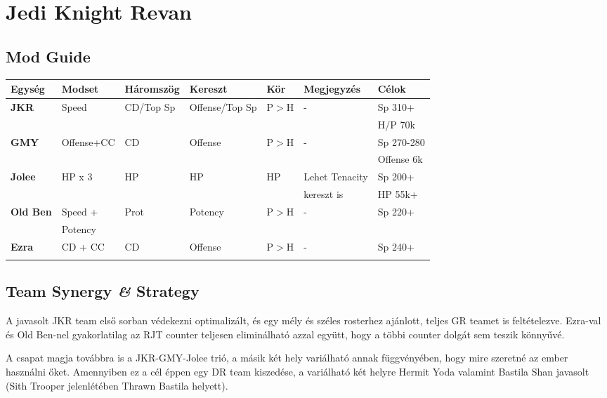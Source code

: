\documentclass[11pt]{report}
\begin{document}
\chapter{Jedi Knight Revan}
\section{Mod Guide}
\begin{center}
    \begin{tabular}{|l | l | l | l | l | l | l |}
        \hline
        Egység & Modset & Háromszög & Kereszt & Kör & Megjegyzés & Célok\\ \hline
        \textbf{JKR} & Speed & CD/Top Sp & Offense/Top Sp & P$>$H & - & Sp 310+\\ 
        &  &  &  &  &  & H/P 70k\\ \hline
        \textbf{GMY} & Offense+CC & CD & Offense & P$>$H & - & Sp 270-280\\
        &  &  &  &  &  & Offense 6k\\ \hline        
        \textbf{Jolee} & HP x 3 & HP & HP & HP & Lehet Tenacity & Sp 200+\\
        &  &  &  &  & kereszt is & HP 55k+\\ \hline
        \textbf{Old Ben} & Speed + & Prot & Potency & P$>$H & - & Sp 220+\\
        & Potency &  &  &  &  & \\ \hline
        \textbf{Ezra} & CD + CC & CD & Offense & P$>$H & - & Sp 240+\\
        &  &  &  &  &  &  \\ \hline
    \end{tabular}
\end{center}
\section{Team Synergy \textit{\&} Strategy}
A javasolt JKR team első sorban védekezni optimalizált, és egy mély és széles rosterhez ajánlott, teljes GR teamet is feltételezve. Ezra-val és Old Ben-nel gyakorlatilag az RJT counter teljesen eliminálható azzal együtt, hogy a többi counter dolgát sem teszik könnyűvé.\par
A csapat magja továbbra is a JKR-GMY-Jolee trió, a másik két hely variálható annak függvényében, hogy mire szeretné az ember használni őket. Amennyiben ez a cél éppen egy DR team kiszedése, a variálható két helyre Hermit Yoda valamint Bastila Shan javasolt (Sith Trooper jelenlétében Thrawn Bastila helyett).
\end{document}
